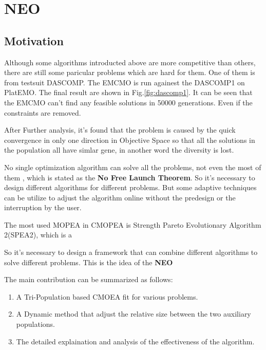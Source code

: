 \documentclass[sigconf]{acmart}
\begin{document}
\section{NEO}

\subsection{Motivation}
Although some algorithms introducted above are more competitive than others, there are still some paricular problems which are hard for them. One of them is from testsuit DASCOMP\cite{dascmop}. The EMCMO is run againest the DASCOMP1 on PlatEMO\cite{platemo}.
The final result are shown in Fig.\ref{fig:dascomp1}. It can be seen that the EMCMO can't find any feasible solutions in 50000 generations. Even if the constraints are removed.

After Further analysis, it's found that the problem is caused by the quick convergence in only one direction in Objective Space so that all the solutions in the population all have simlar gene, in another word the diversity is lost.

No single optimization algorithm can solve all the problems, not even the most of them
, which is stated as the \textbf{No Free Launch Theorem}\cite{nofl}. So it's necessary to design different algorithms for different problems. But some adaptive techniques can be utilize to adjust the algorithm online without the predesign or the interruption by the user.


The most used MOPEA in CMOPEA is Strength Pareto Evolutionary Algorithm 2(SPEA2)\cite{spea2}, which is a


So it's necessary to design a framework that can combine different algorithms to solve different problems.
This is the idea of the \textbf{NEO}

The main contribution can be summarized as follows:
\label{sec:contribution}
\begin{enumerate}
  \item A Tri-Population based CMOEA fit for various problems.
  \item A Dynamic method that adjust the relative size between the two auxiliary populations.
  \item The detailed explaination and analysis of the effectiveness of the algorithm.
\end{enumerate}
\end{document}

